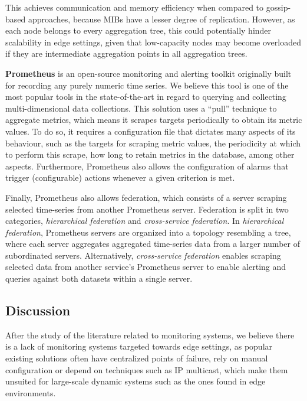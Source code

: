 This achieves communication and memory efficiency when compared to gossip-based approaches, because MIBs have a lesser degree of replication. However, as each node belongs to every aggregation tree, this could potentially hinder scalability in edge settings, given that low-capacity nodes may become overloaded if they are intermediate aggregation points in all aggregation trees. 

\textbf{Prometheus} \cite{prometheus} is an open-source monitoring and alerting toolkit originally built for recording any purely numeric time series. We believe this tool is one of the most popular tools in the state-of-the-art in regard to querying and collecting multi-dimensional data collections. This solution uses a ``pull'' technique to aggregate metrics, which means it scrapes targets periodically to obtain its metric values. To do so, it requires a configuration file that dictates many aspects of its behaviour, such as the targets for scraping metric values, the periodicity at which to perform this scrape, how long to retain metrics in the database, among other aspects. Furthermore, Prometheus also allows the configuration of alarms that trigger (configurable) actions whenever a given criterion is met. 

Finally, Prometheus also allows federation, which consists of a server scraping selected time-series from another Prometheus server. Federation is split in two categories, \textit{hierarchical federation} and \textit{cross-service federation}. In \textit{hierarchical federation}, Prometheus servers are organized into a topology resembling a tree, where each server aggregates aggregated time-series data from a larger number of subordinated servers. Alternatively,  \textit{cross-service federation} enables scraping selected data from another service's Prometheus server to enable alerting and queries against both datasets within a single server. 

\subsection{Discussion}

After the study of the literature related to monitoring systems, we believe there is a lack of monitoring systems targeted towards edge settings, as popular existing solutions often have centralized points of failure, rely on manual configuration or depend on techniques such as IP multicast, which make them unsuited for large-scale dynamic systems such as the ones found in edge environments.

